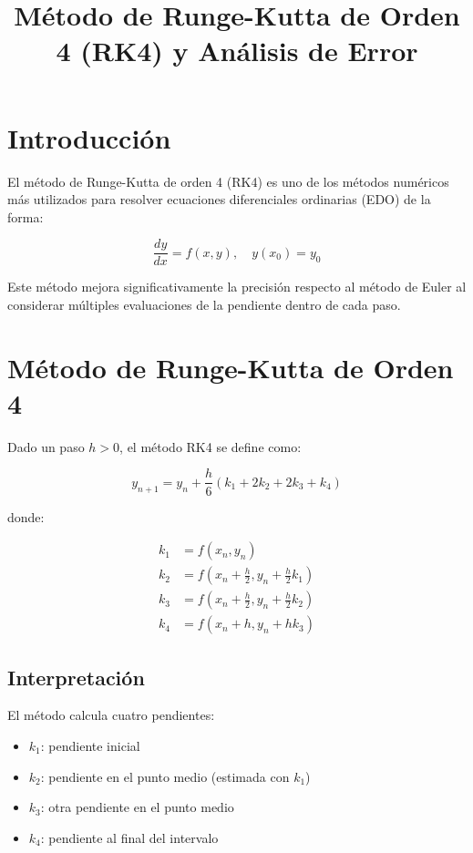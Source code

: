 \documentclass[12pt,a4paper]{article}
\title{Método de Runge-Kutta de Orden 4 (RK4) y Análisis de Error}
\author{}
\date{}
\begin{document}
\maketitle

\section{Introducción}

El método de Runge-Kutta de orden 4 (RK4) es uno de los métodos numéricos más utilizados para resolver ecuaciones diferenciales ordinarias (EDO) de la forma:

\begin{equation}
\frac{dy}{dx} = f(x,y), \quad y(x_0)=y_0
\end{equation}

Este método mejora significativamente la precisión respecto al método de Euler al considerar múltiples evaluaciones de la pendiente dentro de cada paso.

\section{Método de Runge-Kutta de Orden 4}

Dado un paso $h>0$, el método RK4 se define como:

\begin{equation}
y_{n+1} = y_n + \frac{h}{6}\left(k_1 + 2k_2 + 2k_3 + k_4\right)
\end{equation}

donde:

\begin{align}
k_1 &= f(x_n, y_n) \\
k_2 &= f\left(x_n + \frac{h}{2}, y_n + \frac{h}{2}k_1\right) \\
k_3 &= f\left(x_n + \frac{h}{2}, y_n + \frac{h}{2}k_2\right) \\
k_4 &= f(x_n + h, y_n + hk_3)
\end{align}

\subsection{Interpretación}

El método calcula cuatro pendientes:
\begin{itemize}
\item $k_1$: pendiente inicial
\item $k_2$: pendiente en el punto medio (estimada con $k_1$)
\item $k_3$: otra pendiente en el punto medio
\item $k_4$: pendiente al final del intervalo
\end{itemize}
\end{document}
